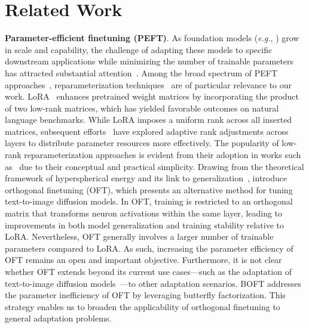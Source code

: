 \section{Related Work}

\textbf{Parameter-efficient finetuning (PEFT)}. As foundation models (\emph{e.g.}, \cite{brown2020language,radford2021learning,rombach2022high,kirillov2023segment}) grow in scale and capability, the challenge of adapting these models to specific downstream applications while minimizing the number of trainable parameters has attracted substantial attention~\cite{treviso2023efficient,ding2023parameter,lialin2023scaling}. Among the broad spectrum of PEFT approaches~\cite{houlsby2019parameter,aghajanyan2020intrinsic,hulora2022,edalati2022krona,wang2022adamix,gheini2021cross,zaken2022bitfit,guo2020parameter,sung2021training,ansell2022composable,lester2021power,li2021prefix,vu2022spot,he2021towards,mao2021unipelt,karimi2021compacter,liu2022few,sung2022lst,chen2022parameter,jia2022visual,chen2022adaptformer,zhang2022neural,jie2023fact,lian2022scaling,luo2023towards}, reparameterization techniques~\cite{aghajanyan2020intrinsic,hulora2022,edalati2022krona} are of particular relevance to our work. LoRA~\cite{hulora2022} enhances pretrained weight matrices by incorporating the product of two low-rank matrices, which has yielded favorable outcomes on natural language benchmarks. While LoRA imposes a uniform rank across all inserted matrices, subsequent efforts~\cite{zhang2022adaptive,valipour2022dylora,zhang2023increlora} have explored adaptive rank adjustments across layers to distribute parameter resources more effectively. The popularity of low-rank reparameterization approaches is evident from their adoption in works such as~\cite{dettmers2023qlora,zi2023delta,chavan2023one} due to their conceptual and practical simplicity. Drawing from the theoretical framework of hyperspherical energy and its link to generalization~\cite{liu2018learning,liu2021orthogonal}, \cite{qiu2023controlling} introduce orthogonal finetuning (OFT), which presents an alternative method for tuning text-to-image diffusion models. In OFT, training is restricted to an orthogonal matrix that transforms neuron activations within the same layer, leading to improvements in both model generalization and training stability relative to LoRA. Nevertheless, OFT generally involves a larger number of trainable parameters compared to LoRA. As such, increasing the parameter efficiency of OFT remains an open and important objective. Furthermore, it is not clear whether OFT extends beyond its current use cases—such as the adaptation of text-to-image diffusion models~\cite{qiu2023controlling}—to other adaptation scenarios. BOFT addresses the parameter inefficiency of OFT by leveraging butterfly factorization. This strategy enables us to broaden the applicability of orthogonal finetuning to general adaptation problems.


